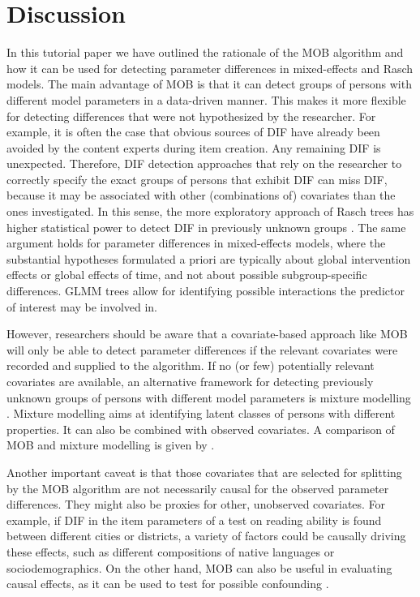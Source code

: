 \documentclass[doc,floatsintext,natbib]{apa7}
\begin{document}
\FloatBarrier
\section{Discussion}
\label{sec:discussion}

In this tutorial paper we have outlined the rationale of the MOB algorithm and how it can be used for detecting parameter differences in mixed-effects and Rasch models. The main advantage of MOB is that it can detect groups of persons with different model parameters in a data-driven manner. This makes it more flexible for detecting differences that were not hypothesized by the researcher. For example, it is often the case that obvious sources of DIF have already been avoided by the content experts during item creation. Any remaining DIF is unexpected. Therefore, DIF detection approaches that rely on the researcher to correctly specify the exact groups of persons that exhibit DIF can miss DIF, because it may be associated with other (combinations of) covariates than the ones investigated. In this sense, the more exploratory approach of Rasch trees has higher statistical power to detect DIF in previously unknown groups \citep{StroyKopf15}. The same argument holds for parameter differences in mixed-effects models, where the substantial hypotheses formulated a priori are typically about global intervention effects or global effects of time, and not about possible subgroup-specific differences. GLMM trees allow for identifying possible interactions the predictor of interest may be involved in.

However, researchers should be aware that a covariate-based approach like MOB will only be able to detect parameter differences if the relevant covariates were recorded and supplied to the algorithm. If no (or few) potentially relevant covariates are available, an alternative framework for detecting previously unknown groups of persons with different model parameters is mixture modelling \citep[see, e.g.,][in the context of Rasch modelling]{AyalySant17,FriStrZei:2015:EaPM}. Mixture modelling aims at identifying latent classes of persons with different properties. It can also be combined with observed covariates. A comparison of MOB and mixture modelling is given by \citet{FriStrZei:2014}.

Another important caveat is that those covariates that are selected for splitting by the MOB algorithm are not necessarily causal for the observed parameter differences. They might also be proxies for other, unobserved covariates. For example, if DIF in the item parameters of a test on reading ability is found between different cities or districts, a variety of factors could be causally driving these effects, such as different compositions of native languages or sociodemographics. On the other hand, MOB can also be useful in evaluating causal effects, as it can be used to test for possible confounding \citep{vanWyLi19}.
\end{document}
